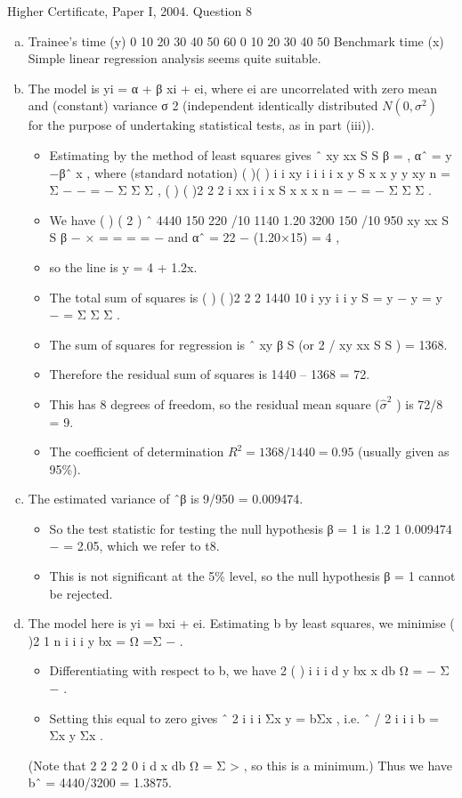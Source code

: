 \documentclass[a4paper,12pt]{article}
\begin{document}
Higher Certificate, Paper I, 2004. Question 8
\begin{enumerate}[(a)]
\item Trainee's time (y)
0
10
20
30
40
50
60
0 10 20 30 40 50
Benchmark time (x)
Simple linear regression analysis seems quite suitable.
\item  The model is yi = α + β xi + ei, where {ei} are uncorrelated with zero mean and
(constant) variance σ 2 (independent identically distributed $N(0, \sigma^2)$ for the purpose of
undertaking statistical tests, as in part (iii)). \begin{itemize}
\item Estimating by the method of least squares
gives
ˆ xy
xx
S
S
β = , αˆ = y −βˆ x ,
where (standard notation)
( )( ) i i
xy i i i i
x y
S x x y y xy
n
= Σ − − = − Σ Σ Σ ,
( ) ( )2
2 2 i
xx i i
x
S x x x
n
= − = − Σ Σ Σ .
\item We have
( )
( 2 )
ˆ 4440 150 220 /10 1140 1.20
3200 150 /10 950
xy
xx
S
S
β
− ×
= = = =
−
and αˆ = 22 − (1.20×15) = 4 ,
\item so the line is
y = 4 + 1.2x.
\item 
The total sum of squares is ( ) ( )2
2 2 1440
10
i
yy i i
y
S = y − y = y − = Σ Σ Σ .

\item The sum of squares for regression is ˆ
xy β S (or 2 / xy xx S S ) = 1368.
\item Therefore the residual sum of squares is 1440 – 1368 = 72.
\item This has 8 degrees of freedom, so the residual mean square ($\hat{\sigma}^2$ ) is 72/8 = 9.
\item The coefficient of determination $R^2 = 1368/1440 = 0.95$ (usually given as 95\%).
\end{itemize}

\item  The estimated variance of ˆβ is 9/950 = 0.009474. 
\begin{itemize}
    \item So the test statistic for
testing the null hypothesis β = 1 is 1.2 1
0.009474
− = 2.05, which we refer to t8.
\item This is not significant at the 5\% level, so the null hypothesis β = 1 cannot be rejected.
\end{itemize}

\item  The model here is yi = bxi + ei.
Estimating b by least squares, we minimise ( )2
1
n
i i
i
y bx
=
Ω =Σ − .
\begin{itemize}
    \item Differentiating with respect to b, we have 2 ( ) i i i
d y bx x
db
Ω = − Σ − .
\item Setting this equal to zero gives ˆ 2
i i i Σx y = bΣx , i.e. ˆ / 2 i i i b = Σx y Σx .
\end{itemize}

(Note that
2
2
2 2 0 i
d x
db
Ω = Σ > , so this is a minimum.)
Thus we have bˆ = 4440/3200 = 1.3875.
\end{enumerate}
\end{document}
